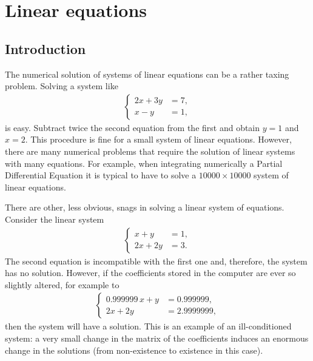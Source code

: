 
\chapter{Linear equations}

\section{Introduction}

The numerical solution of systems of linear equations can be a rather
taxing problem.    Solving a system like
%
\begin{align*}
  \left\{
    \begin{aligned}
      2 x + 3 y & = 7, \\
      x - y & = 1,
    \end{aligned} \right.
\end{align*}
%
is easy.  Subtract twice the second equation from the first and obtain
$y=1$ and $x=2$.  This procedure is fine  for a small system of linear
equations.  However,  there are many  numerical  problems that require
the solution of linear systems with many equations.  For example, when
integrating numerically a Partial Differential  Equation it is typical
to have to solve a $10000 \times 10000$ system of linear equations.

There are other, less obvious, snags in solving a linear system of
equations.     Consider the linear system
%
\begin{align*}
  \left\{
    \begin{aligned}
      x + y & = 1, \\
      2 x + 2 y & = 3.
    \end{aligned} \right.
\end{align*}
%
The second equation is incompatible with the first one and, therefore,
the system has no solution.    However, if the coefficients stored in
the computer are ever so slightly altered, for example to
%
\begin{align*}
  \left\{
    \begin{aligned}
      0.999999 \, x + y & = 0.999999, \\
      2 x + 2 y &= 2.9999999 ,
    \end{aligned} \right.
\end{align*}
%
then the system will have a solution.    This is an example of an
ill-conditioned system: a very small change in the matrix of the
coefficients induces an enormous change in the solutions (from
non-existence to existence in this case).

